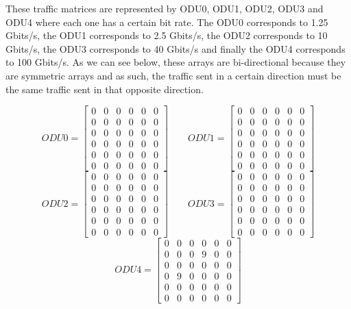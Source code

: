 These traffic matrices are represented by ODU0, ODU1, ODU2, ODU3 and ODU4 where each one has a certain bit rate.
The ODU0 corresponds to 1.25 Gbits/s, the ODU1 corresponds to 2.5 Gbits/s, the ODU2 corresponds to 10 Gbits/s, the ODU3 corresponds to 40 Gbits/s and finally the ODU4 corresponds to 100 Gbits/s.
As we can see below, these arrays are bi-directional because they are symmetric arrays and as such, the traffic sent in a certain direction must be the same traffic sent in that opposite direction.

\[
ODU0=
\begin{bmatrix}
0 & 0 & 0 & 0 & 0 & 0 \\
0 & 0 & 0 & 0 & 0 & 0 \\
0 & 0 & 0 & 0 & 0 & 0 \\
0 & 0 & 0 & 0 & 0 & 0 \\
0 & 0 & 0 & 0 & 0 & 0 \\
0 & 0 & 0 & 0 & 0 & 0
\end{bmatrix}
\qquad ODU1=
\begin{bmatrix}
0 & 0 & 0 & 0 & 0 & 0 \\
0 & 0 & 0 & 0 & 0 & 0 \\
0 & 0 & 0 & 0 & 0 & 0 \\
0 & 0 & 0 & 0 & 0 & 0 \\
0 & 0 & 0 & 0 & 0 & 0 \\
0 & 0 & 0 & 0 & 0 & 0
\end{bmatrix}
\]
\[
ODU2=
\begin{bmatrix}
0 & 0 & 0 & 0 & 0 & 0 \\
0 & 0 & 0 & 0 & 0 & 0 \\
0 & 0 & 0 & 0 & 0 & 0 \\
0 & 0 & 0 & 0 & 0 & 0 \\
0 & 0 & 0 & 0 & 0 & 0 \\
0 & 0 & 0 & 0 & 0 & 0
\end{bmatrix}
\qquad ODU3=
\begin{bmatrix}
0 & 0 & 0 & 0 & 0 & 0 \\
0 & 0 & 0 & 0 & 0 & 0 \\
0 & 0 & 0 & 0 & 0 & 0 \\
0 & 0 & 0 & 0 & 0 & 0 \\
0 & 0 & 0 & 0 & 0 & 0 \\
0 & 0 & 0 & 0 & 0 & 0
\end{bmatrix}
\]
\[
ODU4=
\begin{bmatrix}
0 & 0 & 0 & 0 & 0 & 0 \\
0 & 0 & 0 & 9 & 0 & 0 \\
0 & 0 & 0 & 0 & 0 & 0 \\
0 & 9 & 0 & 0 & 0 & 0 \\
0 & 0 & 0 & 0 & 0 & 0 \\
0 & 0 & 0 & 0 & 0 & 0
\end{bmatrix}
\]

